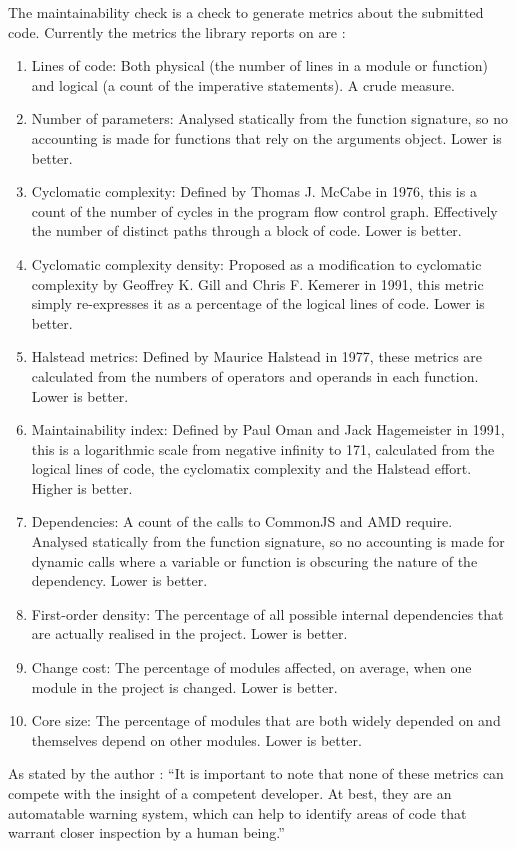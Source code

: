 The maintainability check is a check to generate metrics about the submitted code.
Currently the metrics the library reports on are :
\begin{enumerate}
 \item Lines of code: Both physical (the number of lines in a module or function) and logical (a count of the imperative statements). A crude measure.
 \item Number of parameters: Analysed statically from the function signature, so no accounting is made for functions that rely on the arguments object. Lower is better.
 \item Cyclomatic complexity: Defined by Thomas J. McCabe in 1976, this is a count of the number of cycles in the program flow control graph. Effectively the number of distinct paths through a block of code. Lower is better.
 \item Cyclomatic complexity density: Proposed as a modification to cyclomatic complexity by Geoffrey K. Gill and Chris F. Kemerer in 1991, this metric simply re-expresses it as a percentage of the logical lines of code. Lower is better.
 \item Halstead metrics: Defined by Maurice Halstead in 1977, these metrics are calculated from the numbers of operators and operands in each function. Lower is better.
 \item Maintainability index: Defined by Paul Oman and Jack Hagemeister in 1991, this is a logarithmic scale from negative infinity to 171, calculated from the logical lines of code, the cyclomatix complexity and the Halstead effort. Higher is better.
 \item Dependencies: A count of the calls to CommonJS and AMD require. Analysed statically from the function signature, so no accounting is made for dynamic calls where a variable or function is obscuring the nature of the dependency. Lower is better.
 \item First-order density: The percentage of all possible internal dependencies that are actually realised in the project. Lower is better.
 \item Change cost: The percentage of modules affected, on average, when one module in the project is changed. Lower is better.
 \item Core size: The percentage of modules that are both widely depended on and themselves depend on other modules. Lower is better.
\end{enumerate}

As stated by the author : ``It is important to note that none of these metrics can compete with the insight of a competent developer. At best, they are an automatable warning system, which can help to identify areas of code that warrant closer inspection by a human being.''


